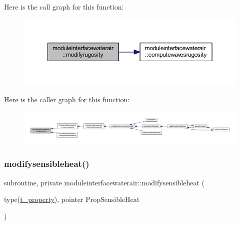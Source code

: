 Here is the call graph for this function\+:\nopagebreak
\begin{figure}[H]
\begin{center}
\leavevmode
\includegraphics[width=350pt]{namespacemoduleinterfacewaterair_aa7f512949a9b145b55378017e58558a7_cgraph}
\end{center}
\end{figure}
Here is the caller graph for this function\+:\nopagebreak
\begin{figure}[H]
\begin{center}
\leavevmode
\includegraphics[width=350pt]{namespacemoduleinterfacewaterair_aa7f512949a9b145b55378017e58558a7_icgraph}
\end{center}
\end{figure}
\mbox{\label{namespacemoduleinterfacewaterair_a2724f68137207e7ade1ca13b482d8f81}} 
\subsubsection{\texorpdfstring{modifysensibleheat()}{modifysensibleheat()}}
{\footnotesize\ttfamily subroutine, private moduleinterfacewaterair\+::modifysensibleheat (\begin{DoxyParamCaption}\item[{type(\mbox{\hyperlink{structmoduleinterfacewaterair_1_1t__property}{t\+\_\+property}}), pointer}]{Prop\+Sensible\+Heat }\end{DoxyParamCaption})\hspace{0.3cm}{\ttfamily [private]}}

